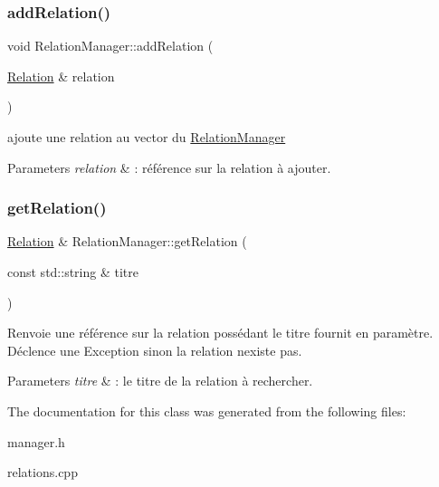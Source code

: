 \subsubsection{\texorpdfstring{add\+Relation()}{addRelation()}}
{\footnotesize\ttfamily void Relation\+Manager\+::add\+Relation (\begin{DoxyParamCaption}\item[{\hyperlink{class_relation}{Relation} \&}]{relation }\end{DoxyParamCaption})}



ajoute une relation au vector du \hyperlink{class_relation_manager}{Relation\+Manager} 


\begin{DoxyParams}{Parameters}
{\em relation} & \+: référence sur la relation à ajouter. \\
\hline
\end{DoxyParams}
\mbox{\label{class_relation_manager_a7e5900e270c2249831355c70b2fd94b8}} 
\subsubsection{\texorpdfstring{get\+Relation()}{getRelation()}}
{\footnotesize\ttfamily \hyperlink{class_relation}{Relation} \& Relation\+Manager\+::get\+Relation (\begin{DoxyParamCaption}\item[{const std\+::string \&}]{titre }\end{DoxyParamCaption})}



Renvoie une référence sur la relation possédant le titre fournit en paramètre. Déclence une Exception sinon la relation n\textquotesingle{}existe pas. 


\begin{DoxyParams}{Parameters}
{\em titre} & \+: le titre de la relation à rechercher. \\
\hline
\end{DoxyParams}


The documentation for this class was generated from the following files\+:\begin{DoxyCompactItemize}
\item 
manager.\+h\item 
relations.\+cpp\end{DoxyCompactItemize}
